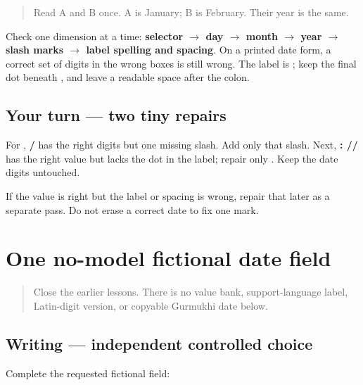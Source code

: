 \begin{quote}
Read A and B once. A is January; B is February. Their year is the same.
\end{quote}

\begin{grammarlens}[title={Grammar lens — a short repair order}]
Check one dimension at a time: \textbf{selector $\to$ day $\to$ month $\to$ year $\to$ slash marks $\to$ label spelling and spacing}. On a printed date form, a correct set of digits in the wrong boxes is still wrong. The label is \textbf{}; keep the final dot beneath \textbf{}, and leave a readable space after the colon.
\end{grammarlens}

\subsection*{Your turn — two tiny repairs}
For \textbf{}, \textbf{/} has the right digits but one missing slash. Add only that slash. Next, \textbf{: //} has the right value but lacks the dot in the label; repair only \textbf{}. Keep the date digits untouched.

\begin{tcolorbox}[breakable,colback=teal!4,colframe=teal!35!black,title={Before you move on}]
If the value is right but the label or spacing is wrong, repair that later as a separate pass. Do not erase a correct date to fix one mark.
\end{tcolorbox}
\section[\texorpdfstring{\pa{ਤਾਰੀਖ਼}: \_\_\_\_\_\_\_\_\_\_ (independent …)}{ਤਾਰੀਖ਼: \_\_\_\_\_\_\_\_\_\_ (independent …)}]{One no-model fictional date field}

\label{lesson:PA-W09-date-no-model}



\begin{quote}
Close the earlier lessons. There is no value bank, support-language label, Latin-digit version, or copyable Gurmukhi date below.
\end{quote}

\subsection*{Writing — independent controlled choice}
Complete the requested fictional field:

